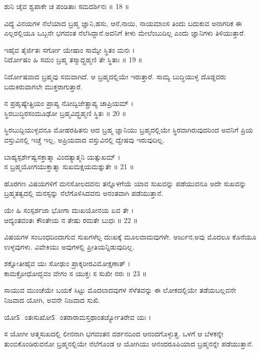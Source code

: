 ಶುನಿ ಚೈವ ಶ್ವಪಾಕೇ ಚ ಪಂಡಿತಾಃ ಸಮದರ್ಶಿನಃ ॥ 18 ॥
\begin{quoting}
ವಿದ್ಯೆ ವಿನಯಗಳ ನೆಲೆಯಾದ ಬ್ರಹ್ಮ ಜ್ಞಾನಿ,ಹಸು, ಆನೆ,ನಾಯಿ, ನಾಯಮಾಂಸ ತಿಂದು ಬದುಕುವ ಅನಾಗರಿಕ ಈ ಎಲ್ಲರಲ್ಲಿಯೂ ಒಬ್ಬನೇ ಭಗವಂತ ನೆಲೆಸಿದ್ದಾನೆ.ಅವನಿಗೆ ಕೀಳು ಮೇಲೆಂಬುದಿಲ್ಲ ಎಂದು ಜ್ಞಾನಿಗಳು ತಿಳಿಯುತ್ತಾರೆ.\\
\end{quoting}
ಇಹೈವ ತೈರ್ಜಿತಃ ಸರ್ಗೋ ಯೇಷಾಂ ಸಾಮ್ಯೇ ಸ್ಥಿತಂ ಮನಃ ।\\
ನಿರ್ದೋಷಂ ಹಿ ಸಮಂ ಬ್ರಹ್ಮ ತಸ್ಮಾದ್ಬ್ರಹ್ಮಣಿ ತೇ ಸ್ಥಿತಾಃ ॥ 19 ॥
\begin{quoting}
ನಿರ್ದೋಷವಾದ ಬ್ರಹ್ಮವು ಸಮವಾಗಿದೆ. ಆ ಬ್ರಹ್ಮದಲ್ಲಿಯೇ ಇರುತ್ತಾರೆ. ಸಾಮ್ಯ ಬುದ್ಧಿಯುಳ್ಳ ದೊಡ್ಡವರು ಬದುಕಿರುವಾಗಲೇ ಮುಕ್ತರಾಗುತ್ತಾರೆ.\\
\end{quoting}
ನ ಪ್ರಹೃಷ್ಯೇತ್ಪ್ರಿಯಂ ಪ್ರಾಪ್ಯ ನೋದ್ವಿಜೇತ್ಪ್ರಾಪ್ಯ ಚಾಪ್ರಿಯಮ್ ।\\
ಸ್ಥಿರಬುದ್ಧಿರಸಂಮೂಢೋ ಬ್ರಹ್ಮವಿದ್ಬ್ರಹ್ಮಣಿ ಸ್ಥಿತಃ ॥ 20 ॥
\begin{quoting}
ಸ್ಥಿರಬುದ್ದಿಯುಳ್ಳವನೂ ಮೋಹರಹಿತನು ಆದ ಬ್ರಹ್ಮ ಜ್ಞಾನಿಯು ಬ್ರಹ್ಮದಲ್ಲಿಯೇ ಸ್ಥಿರವಾಗಿರುವುದರಿಂದ ಅವನಿಗೆ ಪ್ರಿಯ ವಸ್ತುವಿನಲ್ಲಿ ಇಚ್ಚೆ ಇಲ್ಲ, ಅಪ್ರಿಯವಾದ ವಸ್ತುವಿನಲ್ಲಿ ದ್ವೇಷವು ಇರುವುದಿಲ್ಲ.\\
\end{quoting}
ಬಾಹ್ಯಸ್ಪರ್ಶೇಷ್ವಸಕ್ತಾತ್ಮಾ ವಿಂದತ್ಯಾತ್ಮನಿ ಯತ್ಸುಖಮ್ ।\\
ಸ ಬ್ರಹ್ಮಯೋಗಯುಕ್ತಾತ್ಮಾ ಸುಖಮಕ್ಷಯಮಶ್ನುತೇ ॥ 21 ॥
\begin{quoting}
ಹೊರಗಣ ವಿಷಯಗಳಿಗೆ ಮನಸೋಲದವನು ತನ್ನೊಳಗೆಯೆ ಯಾವ ಸುಖವನ್ನು ಪಡೆಯುವನೂ ಅದೇ ಸುಖವನ್ನು ಬ್ರಹ್ಮತತ್ವದಲ್ಲಿ ಮನಸ್ಸನ್ನು ನೆಲೆಗೊಳಿಸಿದವನು ಅನಂತವಾಗಿ ಪಡೆಯುತ್ತಾನೆ.\\
\end{quoting}
ಯೇ ಹಿ ಸಂಸ್ಪರ್ಶಜಾ ಭೋಗಾ ದುಃಖಯೋನಯ ಏವ ತೇ ।\\
ಆದ್ಯಂತವಂತಃ ಕೌಂತೇಯ ನ ತೇಷು ರಮತೇ ಬುಧಃ ॥ 22 ॥
\begin{quoting}
ವಿಷಯಗಳ ಸಂಬಂಧದಿಂದಾಗುವ ಸುಖಗಳೆಲ್ಲ ದುಃಖಕ್ಕೆ ಮೂಲವಾದುವುಗಳೇ. ಅರ್ಜುನ,ಅವು ಮೊದಲೂ ಕೊನೆಯೂ ಉಳ್ಳವುಗಳು. ವಿವೇಕಿಯು ಅವುಗಳಲ್ಲಿ ಪ್ರೀತಿಯನ್ನಿಡುವುದಿಲ್ಲ.\\
\end{quoting}
ಶಕ್ನೋತೀಹೈವ ಯಃ ಸೋಢುಂ ಪ್ರಾಕ್ಶರೀರವಿಮೋಕ್ಷಣಾತ್ ।\\
ಕಾಮಕ್ರೋಧೋದ್ಭವಂ ವೇಗಂ ಸ ಯುಕ್ತಃ ಸ ಸುಖೀ ನರಃ ॥ 23 ॥
\begin{quoting}
ಸಾಯುವ ಮುಂಚೆಯೇ ಬಯಕೆ ಸಿಟ್ಟು ಮೊದಲಾದವುಗಳ ಸೆಳೆತವನ್ನು ಈ ಲೋಕದಲ್ಲಿಯೇ ತಡೆಯಬಲ್ಲವನೇ ನಿಜವಾದ ಯೋಗಿ, ಅವನೇ ನಿಜವಾದ ಸುಖಿ.\\
\end{quoting}
ಯೋऽಂತಃಸುಖೋऽಂತರಾರಾಮಸ್ತಥಾಂತರ್ಜ್ಯೋತಿರೇವ ಯಃ ।
\begin{quoting}
ಸ ಯೋಗೀ  ಆತ್ಮಸುಖದಲ್ಲಿ ಲೀನನಾಗಿ ಭಗವಂತನ ದರ್ಶನದಿಂದ ಆನಂದಗೊಳ್ಳುತ್ತ. ಒಳಗೆ ಆ ಬೆಳಕನ್ನೇ ತುಂಬಿಕೊಂಡಿರುವನೋ ಬ್ರಹ್ಮನಲ್ಲಿಯೇ ನೆಲೆಗೊಂಡ ಆ ಯೋಗಿಯು ಆನಂದರೂಪಿಯಾದ ಬ್ರಹ್ಮನನ್ನೇ ಪಡೆಯುತ್ತಾನೆ.\\
\end{quoting}
